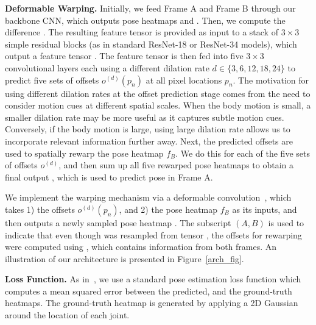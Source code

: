 \documentclass{article}
\begin{document}
\textbf{Deformable Warping.} Initially, we feed Frame A and Frame B through our backbone CNN, which outputs pose heatmaps  and . Then, we compute the difference . The resulting feature tensor  is provided as input to a stack of $3 \times 3$ simple residual blocks (as in standard ResNet-18 or ResNet-34 models), which output a feature tensor . The feature tensor   is then fed into five $3 \times 3$ convolutional layers each using a different dilation rate $d \in\{3, 6, 12, 18, 24\}$ to predict five sets of offsets $o^{(d)} (p_n)$ at all pixel locations $p_n$. The motivation for using different dilation rates at the offset prediction stage comes from the need to consider motion cues at different spatial scales. When the body motion is small, a smaller dilation rate may be more useful as it captures subtle motion cues. Conversely, if the body motion is large, using large dilation rate allows us to incorporate relevant information further away. Next, the predicted offsets are used to spatially rewarp the pose heatmap $f_{B}$. We do this for each of the five sets of offsets $o^{(d)}$, and then sum up all five rewarped pose heatmaps to obtain a final output , which is used to predict pose in Frame A.




We implement the warping mechanism via a deformable convolution~\cite{8237351}, which takes 1) the offsets $o^{(d)}(p_n)$, and 2) the pose heatmap $f_{B}$ as its inputs, and then outputs a newly sampled pose heatmap .  The subscript $(A,B)$ is used to indicate that even though   was resampled from tensor , the offsets for rewarping were computed using , which contains information from both frames. An illustration of our architecture is presented in Figure~\ref{arch_fig}.








\textbf{Loss Function.} As in~\cite{sun2019deep}, we use a standard pose estimation loss function which computes a mean squared error between the predicted, and the ground-truth heatmaps. The ground-truth heatmap is generated by applying a 2D Gaussian around the location of each joint.
\end{document}
